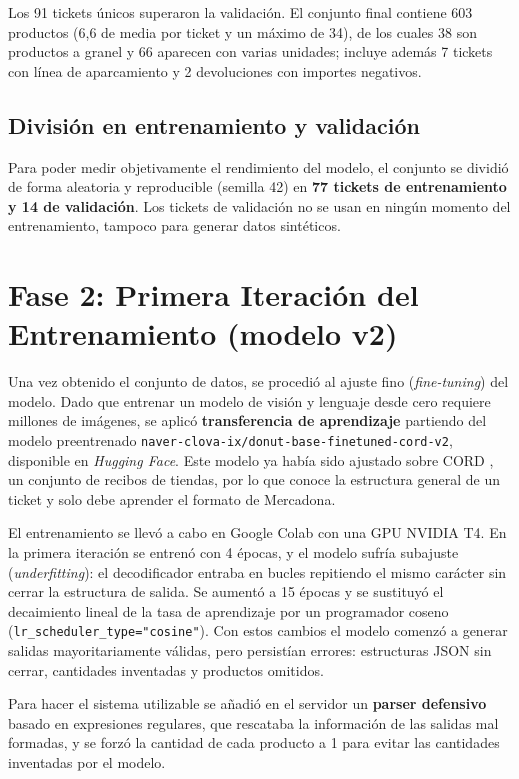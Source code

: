 Los 91 tickets únicos superaron la validación. El conjunto final contiene 603 productos (6,6 de media por ticket y un máximo de 34), de los cuales 38 son productos a granel y 66 aparecen con varias unidades; incluye además 7 tickets con línea de aparcamiento y 2 devoluciones con importes negativos.

\subsection{División en entrenamiento y validación}
Para poder medir objetivamente el rendimiento del modelo, el conjunto se dividió de forma aleatoria y reproducible (semilla 42) en \textbf{77 tickets de entrenamiento y 14 de validación}. Los tickets de validación no se usan en ningún momento del entrenamiento, tampoco para generar datos sintéticos.

\section{Fase 2: Primera Iteración del Entrenamiento (modelo v2)}
Una vez obtenido el conjunto de datos, se procedió al ajuste fino (\textit{fine-tuning}) del modelo. Dado que entrenar un modelo de visión y lenguaje desde cero requiere millones de imágenes, se aplicó \textbf{transferencia de aprendizaje} partiendo del modelo preentrenado \texttt{naver-clova-ix/donut-base-finetuned-cord-v2}, disponible en \textit{Hugging Face}. Este modelo ya había sido ajustado sobre CORD \parencite{park2019cord}, un conjunto de recibos de tiendas, por lo que conoce la estructura general de un ticket y solo debe aprender el formato de Mercadona.

El entrenamiento se llevó a cabo en Google Colab con una GPU NVIDIA T4. En la primera iteración se entrenó con 4 épocas, y el modelo sufría subajuste (\textit{underfitting}): el decodificador entraba en bucles repitiendo el mismo carácter sin cerrar la estructura de salida. Se aumentó a 15 épocas y se sustituyó el decaimiento lineal de la tasa de aprendizaje por un programador coseno (\texttt{lr\_scheduler\_type="cosine"}). Con estos cambios el modelo comenzó a generar salidas mayoritariamente válidas, pero persistían errores: estructuras JSON sin cerrar, cantidades inventadas y productos omitidos.

Para hacer el sistema utilizable se añadió en el servidor un \textbf{parser defensivo} basado en expresiones regulares, que rescataba la información de las salidas mal formadas, y se forzó la cantidad de cada producto a 1 para evitar las cantidades inventadas por el modelo.

